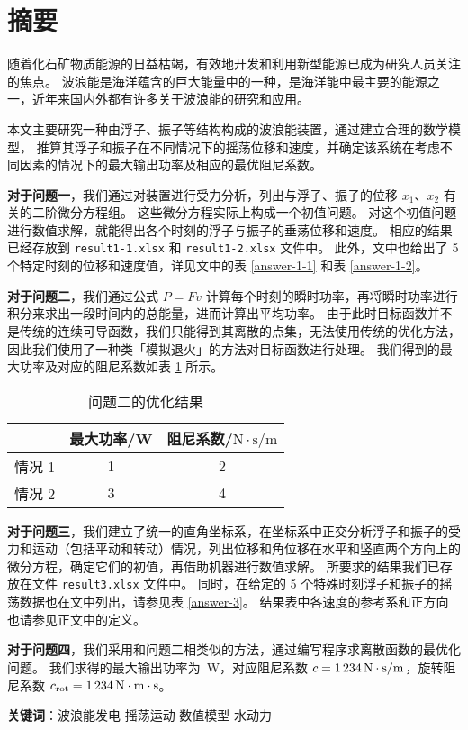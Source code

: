 \section*{摘要}
随着化石矿物质能源的日益枯竭，有效地开发和利用新型能源已成为研究人员关注的焦点。
波浪能是海洋蕴含的巨大能量中的一种，是海洋能中最主要的能源之一，近年来国内外都有许多关于波浪能的研究和应用。

本文主要研究一种由浮子、振子等结构构成的波浪能装置，通过建立合理的数学模型，
推算其浮子和振子在不同情况下的摇荡位移和速度，并确定该系统在考虑不同因素的情况下的最大输出功率及相应的最优阻尼系数。

\textbf{对于问题一}，我们通过对装置进行受力分析，列出与浮子、振子的位移 $x_1$、$x_2$ 有关的二阶微分方程组。
这些微分方程实际上构成一个初值问题。
对这个初值问题进行数值求解，就能得出各个时刻的浮子与振子的垂荡位移和速度。
相应的结果已经存放到 \verb|result1-1.xlsx| 和 \verb|result1-2.xlsx| 文件中。
此外，文中也给出了 5 个特定时刻的位移和速度值，详见文中的表 \ref{answer-1-1} 和表 \ref{answer-1-2}。

\textbf{对于问题二}，我们通过公式 $P=Fv$ 计算每个时刻的瞬时功率，再将瞬时功率进行积分来求出一段时间内的总能量，进而计算出平均功率。
由于此时目标函数并不是传统的连续可导函数，我们只能得到其离散的点集，无法使用传统的优化方法，因此我们使用了一种类「模拟退火」的方法对目标函数进行处理。
我们得到的最大功率及对应的阻尼系数如表 \ref{answer-2} 所示。
\begin{table}[htbp]
    \centering
    \begin{tabular}{ccc}
        \toprule
        & 最大功率/W & 阻尼系数/$\mathrm{N}\cdot\mathrm{s}/\mathrm{m}$ \\
        \midrule
        情况 1 & 1 & 2 \\
        情况 2 & 3 & 4 \\
        \bottomrule
    \end{tabular}
    \caption{问题二的优化结果}
    \label{answer-2}
\end{table}

\textbf{对于问题三}，我们建立了统一的直角坐标系，在坐标系中正交分析浮子和振子的受力和运动（包括平动和转动）情况，列出位移和角位移在水平和竖直两个方向上的微分方程，确定它们的初值，再借助机器进行数值求解。
所要求的结果我们已存放在文件 \verb|result3.xlsx| 文件中。
同时，在给定的 5 个特殊时刻浮子和振子的摇荡数据也在文中列出，请参见表 \ref{answer-3}。
结果表中各速度的参考系和正方向也请参见正文中的定义。

\textbf{对于问题四}，我们采用和问题二相类似的方法，通过编写程序求离散函数的最优化问题。
我们求得的最大输出功率为 \,W，对应阻尼系数 $c=\N{1234}\,\mathrm{N}\cdot\mathrm{s}/\mathrm{m}$，旋转阻尼系数 $c_\text{rot}=\N{1234}\,\mathrm{N}\cdot\mathrm{m}\cdot\mathrm{s}$。

\vfill

\textbf{关键词}：波浪能发电 \hspace{1em} 摇荡运动 \hspace{1em} 数值模型 \hspace{1em} 水动力
